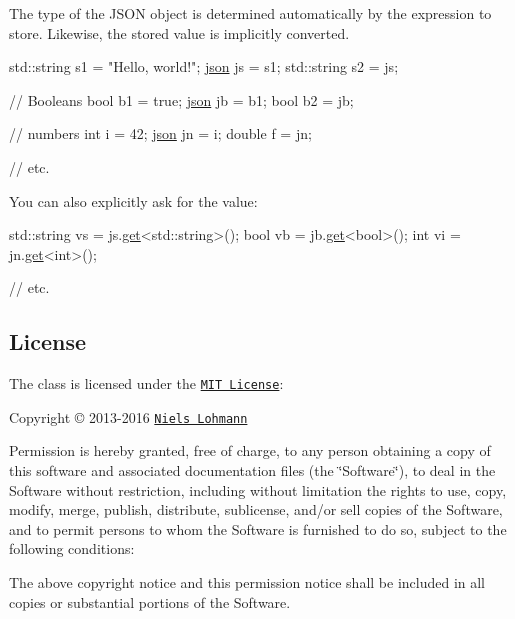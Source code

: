 The type of the J\+S\+ON object is determined automatically by the expression to store. Likewise, the stored value is implicitly converted.


\begin{DoxyCode}
std::string s1 = \textcolor{stringliteral}{"Hello, world!"};
\hyperlink{a00025}{json} js = s1;
std::string s2 = js;

\textcolor{comment}{// Booleans}
\textcolor{keywordtype}{bool} b1 = \textcolor{keyword}{true};
\hyperlink{a00025}{json} jb = b1;
\textcolor{keywordtype}{bool} b2 = jb;

\textcolor{comment}{// numbers}
\textcolor{keywordtype}{int} i = 42;
\hyperlink{a00025}{json} jn = i;
\textcolor{keywordtype}{double} f = jn;

\textcolor{comment}{// etc.}
\end{DoxyCode}


You can also explicitly ask for the value\+:


\begin{DoxyCode}
std::string vs = js.\hyperlink{a00025_a20bfb2ca6d4c421c74bb3e53328cd437}{get}<std::string>();
\textcolor{keywordtype}{bool} vb = jb.\hyperlink{a00025_a20bfb2ca6d4c421c74bb3e53328cd437}{get}<\textcolor{keywordtype}{bool}>();
\textcolor{keywordtype}{int} vi = jn.\hyperlink{a00025_a20bfb2ca6d4c421c74bb3e53328cd437}{get}<\textcolor{keywordtype}{int}>();

\textcolor{comment}{// etc.}
\end{DoxyCode}


\subsection*{License}



The class is licensed under the \href{http://opensource.org/licenses/MIT}{\tt M\+IT License}\+:

Copyright \copyright{} 2013-\/2016 \href{http://nlohmann.me}{\tt Niels Lohmann}

Permission is hereby granted, free of charge, to any person obtaining a copy of this software and associated documentation files (the \char`\"{}\+Software\char`\"{}), to deal in the Software without restriction, including without limitation the rights to use, copy, modify, merge, publish, distribute, sublicense, and/or sell copies of the Software, and to permit persons to whom the Software is furnished to do so, subject to the following conditions\+:

The above copyright notice and this permission notice shall be included in all copies or substantial portions of the Software.

